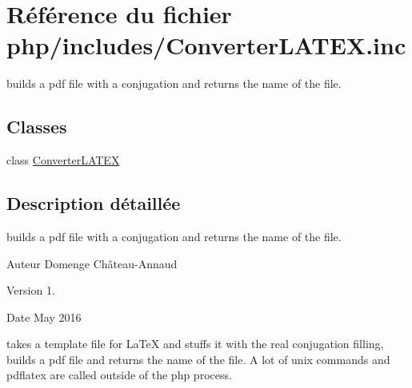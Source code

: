 \hypertarget{_converter_l_a_t_e_x_8inc}{}\section{Référence du fichier php/includes/\+Converter\+L\+A\+T\+EX.inc}
\label{_converter_l_a_t_e_x_8inc}


builds a pdf file with a conjugation and returns the name of the file.  


\subsection*{Classes}
\begin{DoxyCompactItemize}
\item 
class \hyperlink{class_converter_l_a_t_e_x}{Converter\+L\+A\+T\+EX}
\end{DoxyCompactItemize}


\subsection{Description détaillée}
builds a pdf file with a conjugation and returns the name of the file. 

\begin{DoxyAuthor}{Auteur}
Domenge Château-\/\+Annaud 
\end{DoxyAuthor}
\begin{DoxyVersion}{Version}
1. 
\end{DoxyVersion}
\begin{DoxyDate}{Date}
May 2016
\end{DoxyDate}
takes a template file for La\+TeX and stuffs it with the real conjugation filling, builds a pdf file and returns the name of the file. A lot of unix commands and pdflatex are called outside of the php process. 